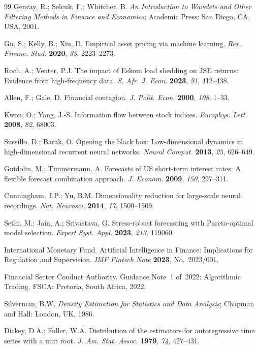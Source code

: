 \documentclass[11pt,a4paper]{article}  %
\theoremstyle{plain}
\theoremstyle{definition}
\theoremstyle{remark}
\begin{document}
\begin{thebibliography}{99}
Gencay, R.; Selcuk, F.; Whitcher, B.
\textit{An Introduction to Wavelets and Other Filtering Methods
in Finance and Economics};
Academic Press: San Diego, CA, USA, 2001.

Gu, S.; Kelly, B.; Xiu, D. Empirical asset pricing via machine
learning.
\textit{Rev. Financ. Stud.} \textbf{2020}, \textit{33}, 2223--2273.

Roch, A.; Venter, P.J. The impact of Eskom load shedding on JSE
returns: Evidence from high-frequency data.
\textit{S. Afr. J. Econ.} \textbf{2023}, \textit{91}, 412--438.

Allen, F.; Gale, D. Financial contagion.
\textit{J. Polit. Econ.} \textbf{2000}, \textit{108}, 1--33.

Kwon, O.; Yang, J.-S. Information flow between stock indices.
\textit{Europhys. Lett.} \textbf{2008}, \textit{82}, 68003.

Sussillo, D.; Barak, O. Opening the black box: Low-dimensional
dynamics in high-dimensional recurrent neural networks.
\textit{Neural Comput.} \textbf{2013}, \textit{25}, 626--649.

Guidolin, M.; Timmermann, A. Forecasts of US short-term interest
rates: A flexible forecast combination approach.
\textit{J. Econom.} \textbf{2009}, \textit{150}, 297--311.

Cunningham, J.P.; Yu, B.M. Dimensionality reduction for large-scale
neural recordings.
\textit{Nat. Neurosci.} \textbf{2014}, \textit{17}, 1500--1509.

Sethi, M.; Jain, A.; Srivastava, G. Stress-robust forecasting with
Pareto-optimal model selection.
\textit{Expert Syst. Appl.} \textbf{2023}, \textit{213}, 119060.

International Monetary Fund. Artificial Intelligence in Finance:
Implications for Regulation and Supervision.
\textit{IMF Fintech Note} \textbf{2023}, No.~2023/001.

Financial Sector Conduct Authority. Guidance Note~1 of~2022:
Algorithmic Trading. FSCA: Pretoria, South Africa, 2022.

Silverman, B.W. \textit{Density Estimation for Statistics and
Data Analysis}; Chapman and Hall: London, UK, 1986.

Dickey, D.A.; Fuller, W.A. Distribution of the estimators for
autoregressive time series with a unit root.
\textit{J. Am. Stat. Assoc.} \textbf{1979}, \textit{74}, 427--431.


\end{thebibliography}
\end{document}

